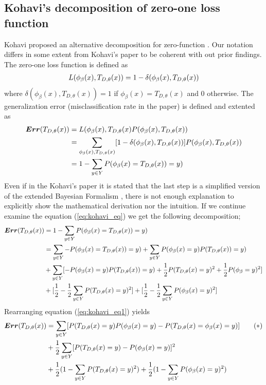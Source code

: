 \subsection{Kohavi's decomposition of zero-one loss function}
\label{app:kohavi_decomp}
Kohavi proposed an alternative decomposition for zero-function \cite{kohavi1996bias}. 
Our notation differs in some extent from Kohavi's paper to be coherent with out prior findings. 
The zero-one loss function is defined as
\begin{align}
L(\phi_{\beta}(x), T_{D,\theta}(x)) = 1 - \delta(\phi_{\beta}(x), T_{D, \theta}(x)) \notag
\end{align}
where $\delta(\phi_{\beta}(x), T_{D, \theta}(x)) = 1$ if $\phi_{\beta}(x) = T_{D, \theta}(x)$ and 0 otherwise. The generalization error (misclassification rate in the paper) is defined and extented as
\begin{align}\label{eq:kohavi_eq}
\boldsymbol{Err}(T_{D, \theta}(x)) 
& = L(\phi_{\beta}(x), T_{D,\theta}(x) P(\phi_{\beta}(x), T_{D, \theta}(x)) \notag \\
& = \sum_{\phi_{\beta}(x), T_{D, \theta}(x)} [1 - \delta(\phi_{\beta}(x), T_{D, \theta}(x))] P(\phi_{\beta}(x), T_{D, \theta}(x)) \notag \\
& = 1 - \sum_{y \in Y} P(\phi_{\beta}(x) = T_{D, \theta}(x)) = y)
\end{align}
Even if in the Kohavi's paper it is stated that the last step is a 
simplified version of the extended Bayesian Formalism \cite{wolpert2018relationship}, 
there is not enough explanation to explicitly show the mathematical derivation nor the intuition. If we continue examine the equation (\ref{eq:kohavi_eq}) we get the following decomposition;
\begin{align}\label{eq:kohavi_eq1}
\boldsymbol{Err}(T_{D, \theta}(x))
& = 1 - \sum_{y \in Y} P(\phi_{\beta}(x) = T_{D, \theta}(x)) = y) \notag\\
& = \sum_{y \in Y} -P(\phi_{\beta}(x) = T_{D, \theta}(x)) = y) + \sum_{y \in Y} P(\phi_{\beta}(x) = y) P(T_{D, \theta}(x)) = y) \notag\\
& + \sum_{y \in Y}[-P(\phi_{\beta}(x) = y) P(T_{D, \theta}(x)) = y) + \dfrac{1}{2}P(T_{D, \theta}(x) = y)^2 + \dfrac{1}{2}P(\phi_{\beta} = y)^2] \notag\\
& + [\dfrac{1}{2} - \dfrac{1}{2}\sum_{y \in Y} P(T_{D,\theta}(x)= y)^2] + [\dfrac{1}{2} - \dfrac{1}{2}\sum_{y \in Y} P(\phi_{\beta}(x)= y)^2]
\end{align}
Rearranging equation (\ref{eq:kohavi_eq1}) yields
\begin{align}\label{eq:kohavi_eq2}
\boldsymbol{Err}(T_{D, \theta}(x))
& = \sum_{y \in Y} [P(T_{D,\theta}(x)=y)P(\phi_{\beta}(x) = y) - P(T_{D,\theta}(x) = \phi_{\beta}(x) = y)]\tag{$*$} \\
& + \dfrac{1}{2}\sum_{y \in Y} [P(T_{D,\theta}(x)=y) - P(\phi_{\beta}(x) = y)]^2\notag \\
& + \dfrac{1}{2}(1 - \sum_{y \in Y}P(T_{D, \theta}(x) = y)^2) + \dfrac{1}{2}(1 - \sum_{y \in Y}P(\phi_{\beta}(x) = y)^2)\notag \\
\end{align}
